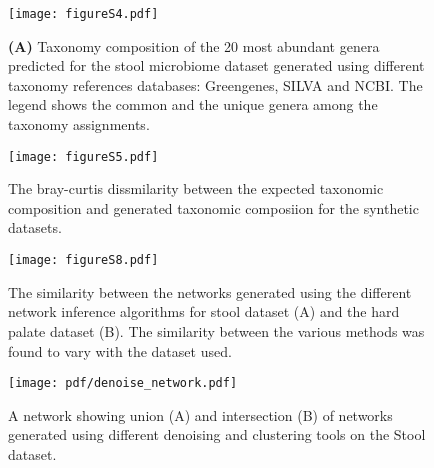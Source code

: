   \begin{figure}[h]
    \centering
    \texttt{[image: figureS4.pdf]}
    \caption{
      \textbf{(A)} Taxonomy composition of the 20 most abundant genera predicted for the stool microbiome dataset generated using different taxonomy references databases: Greengenes, SILVA and NCBI.
      The legend shows the common and the unique genera among the taxonomy assignments.
  }
    \label{fig:figureS4}
  \end{figure}

  \begin{figure}[h]
    \centering
    \texttt{[image: figureS5.pdf]}
    \caption{
      The bray-curtis dissmilarity between the expected taxonomic composition and generated taxonomic composiion for the synthetic datasets.
  }
  \label{fig:figureS5}
  \end{figure}


  \begin{figure}[h]
    \centering
    \texttt{[image: figureS8.pdf]}
    \caption{
      The similarity between the networks generated using the different network inference algorithms for stool dataset (A) and the hard palate dataset (B).
      The similarity between the various methods was found to vary with the dataset used.
  }
    \label{fig:figureS8}
  \end{figure}

  \begin{figure}[h]
    \centering
    \texttt{[image: pdf/denoise\_network.pdf]}
    \caption{A network showing union (A) and intersection (B) of networks generated using different denoising and clustering tools on the Stool dataset.}
    \label{fig:figureS5}
  \end{figure}
